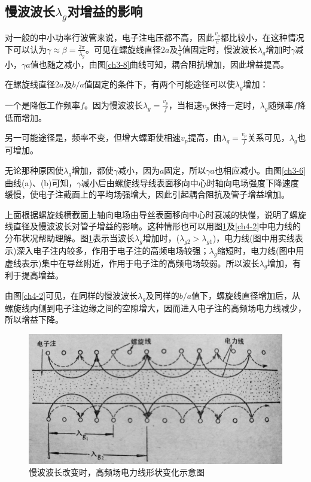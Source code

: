 \subsection[慢波波长lambda\_g对增益的影响]{慢波波长$ \lambda_g $对增益的影响}
 对一般的中小功率行波管来说，电子注电压都不高，因此$ \frac{v_p}{c} $都比较小，在这种情况下可以认为$ \gamma \approx \beta = \frac{2\pi}{\lambda_g} $。可见在螺旋线直径$ 2a $及$ \frac{b}{a} $值固定时，慢波波长$ \lambda_g $增加时$ \gamma $减小，$ \gamma a $值也随之减小，由图\ref{ch3-8}曲线可知，耦合阻抗增加，因此增益提高。
 
 在螺旋线直径$ 2a $及$ b/a $值固定的条件下，有两个可能途径可以使$ \lambda_g $增加：

 一个是降低工作频率$ f $。因为慢波波长$ \lambda_g = \frac{v_p}{f} $，当相速$ v_p $保持一定时，$ \lambda_g $随频率$ f $降低而增加。
 
 另一可能途径是，频率不变，但增大螺距使相速$ v_p $提高，由$ \lambda_g = \frac{v_p}{f} $关系可见，$ \lambda_g $也可增加。

 
 无论那种原因使$ \lambda_g $增加，都使$ \gamma $减小，因为$ a $固定，所以$ \gamma a $也相应减小。由图\ref{ch3-6}曲线(a)、(b)可知，$ \gamma $减小后由螺旋线导线表面移向中心时轴向电场强度下降速度缓慢，使电子注截面上的平均场强增大，因此引起耦合阻抗及管子增益增加。

 
 上面根据螺旋线横截面上轴向电场由导丝表面移向中心时衰减的快慢，说明了螺旋线直径及慢波波长对管子增益的影响。这种情形也可以用图\ref{ch4-1}及\ref{ch4-2}中电力线的分布状况帮助理解。图\ref{ch4-1}表示当波长$ \lambda_g $增加时，($ \lambda_{g2} > \lambda_{g1} $)，电力线(图中用实线表示)深入电子注内较多，作用于电子注的高频电场较强；$ \lambda_g $缩短时，电力线(图中用虚线表示)集中在导丝附近，作用于电子注的高频电场较弱。所以波长$ \lambda_g $增加，有利于提高增益。
 
 由图\ref{ch4-2}可见，在同样的慢波波长$ \lambda_g $及同样的$ b/a $值下，螺旋线直径增加后，从螺旋线内侧到电子注边缘之间的空隙增大，因而进入电子注的高频场电力线减少，所以增益下降。
\begin{figure}[phtb]
	\centering
	\includegraphics[width=0.65\linewidth]{figure/ch4-1}
	\caption{慢波波长改变时，高频场电力线形状变化示意图}
	\label{ch4-1}
\end{figure}

